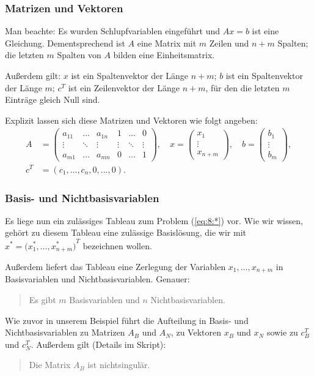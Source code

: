 \documentclass[smaller]{beamer}
\begin{document}
\begin{frame}
\frametitle{Matrizen und Vektoren}
 \alert{Man beachte}: Es wurden \alert{Schlupfvariablen} eingeführt und $Ax=b$ ist eine \alert{Gleichung}. Dementsprechend ist $A$ eine Matrix mit $m$ Zeilen und $n+m$ Spalten; die letzten $m$ Spalten von $A$ bilden eine Einheitsmatrix. \\ \vspace*{0.2cm}

Außerdem gilt: $x$ ist ein Spaltenvektor der Länge $n+m$; $b$ ist ein Spaltenvektor der Länge $m$; $c^T$ ist ein Zeilenvektor der Länge $n+m$, für den die letzten $m$ Einträge gleich Null sind.

Explizit lassen sich diese Matrizen und Vektoren wie folgt angeben:
\begin{align*}
A &= \begin{pmatrix} 
a_{11} & \ldots & a_{1n} & 1 & \ldots & 0 \\ 
\vdots & \ddots & \vdots & \vdots & \ddots & \vdots \\
a_{m1} & \ldots & a_{mn} & 0 & \ldots & 1
\end{pmatrix}, \quad
x = \begin{pmatrix} x_1 \\ \vdots \\ x_{n+m} \end{pmatrix}, \quad
b = \begin{pmatrix} b_1 \\ \vdots \\ b_m \end{pmatrix}, \\
c^T &= (c_1, \ldots, c_n, 0, \ldots, 0).  
\end{align*}
\end{frame}

\begin{frame}
 \frametitle{Basis- und Nichtbasisvariablen}
 Es liege nun ein zulässiges Tableau zum Problem (\ref{eq:8:*}) vor. Wie wir wissen, gehört zu diesem Tableau eine zulässige Basislösung, die wir mit $x^* = {\bigl(x_1^*, \ldots, x_{n+m}^*\bigr)}^T$ bezeichnen wollen.

Außerdem liefert das Tableau eine Zerlegung der Variablen $x_1,\ldots,x_{n+m}$ in Basisvariablen und Nichtbasisvariablen. Genauer:
\begin{quote}
\alert{Es gibt $m$ Basisvariablen und $n$ Nichtbasisvariablen.}
\end{quote}

Wie zuvor in unserem Beispiel führt die Aufteilung in Basis- und Nichtbasisvariablen zu Matrizen $A_B$ und $A_N$, zu Vektoren $x_B$ und $x_N$ sowie zu $c_B^T$ und $c_N^T$. Außerdem gilt (Details im Skript):
\begin{quote}
\alert{Die Matrix $A_B$ ist nichtsingulär.}
\end{quote}
\end{frame}
\end{document}
